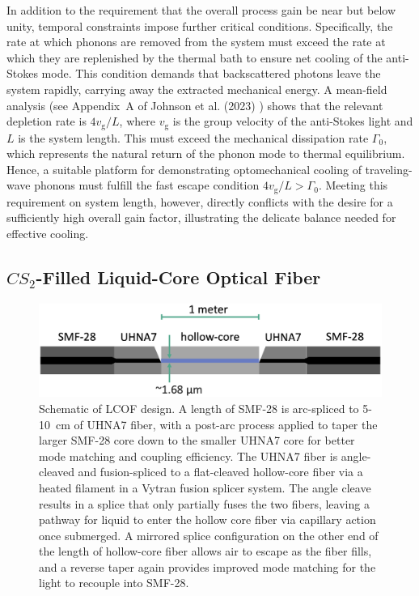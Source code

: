 In addition to the requirement that the overall process gain be near but below unity, temporal constraints impose further critical conditions. Specifically, the rate at which phonons are removed from the system must exceed the rate at which they are replenished by the thermal bath to ensure net cooling of the anti-Stokes mode. This condition demands that backscattered photons leave the system rapidly, carrying away the extracted mechanical energy. A mean-field analysis (see Appendix~A of Johnson et al. (2023) \cite{johnson2023laser}) shows that the relevant depletion rate is \(4v_{\mathrm{g}}/L\), where \(v_{\mathrm{g}}\) is the group velocity of the anti-Stokes light and \(L\) is the system length. This must exceed the mechanical dissipation rate \(\Gamma_{\mathrm{0}}\), which represents the natural return of the phonon mode to thermal equilibrium. Hence, a suitable platform for demonstrating optomechanical cooling of traveling-wave phonons must fulfill the fast escape condition \(4v_{\mathrm{g}}/L > \Gamma_{\mathrm{0}}\). Meeting this requirement on system length, however, directly conflicts with the desire for a sufficiently high overall gain factor, illustrating the delicate balance needed for effective cooling.


\subsection{\texorpdfstring{$CS_{2}$}{CS2}-Filled Liquid-Core Optical Fiber}
\label{Cooling:subsec:CS2FilledLCOF}

\begin{figure}[t]
  \centering
  \includegraphics[width=\textwidth]{figs/3-Cooling/LCOFdiagram.png}
  \caption{Schematic of \ac{LCOF} design. A length of \ac{SMF-28} is arc-spliced to 5-\SI{10}{\centi\meter} of \ac{UHNA7} fiber, with a post-arc process applied to taper the larger \ac{SMF-28} core down to the smaller \ac{UHNA7} core for better mode matching and coupling efficiency. The \ac{UHNA7} fiber is angle-cleaved and fusion-spliced to a flat-cleaved hollow-core fiber via a heated filament in a Vytran fusion splicer system. The angle cleave results in a splice that only partially fuses the two fibers, leaving a pathway for liquid to enter the hollow core fiber via capillary action once submerged. A mirrored splice configuration on the other end of the length of hollow-core fiber allows air to escape as the fiber fills, and a reverse taper again provides improved mode matching for the light to recouple into \ac{SMF-28}.}
  \label{fig:LCOF diagram}
\end{figure}

